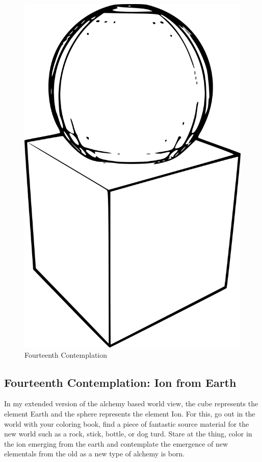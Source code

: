 \begin{figure}[htbp]
\centering
\includegraphics{images/contemplations/contemplation14C.png}
\caption{Fourteenth Contemplation}
\end{figure}

\subsection{Fourteenth Contemplation: Ion from
Earth}\label{fourteenth-contemplation-ion-from-earth}

In my extended version of the alchemy based world view, the cube
represents the element Earth and the sphere represents the element Ion.
For this, go out in the world with your coloring book, find a piece of
fantastic source material for the new world such as a rock, stick,
bottle, or dog turd. Stare at the thing, color in the ion emerging from
the earth and contemplate the emergence of new elementals from the old
as a new type of alchemy is born.
